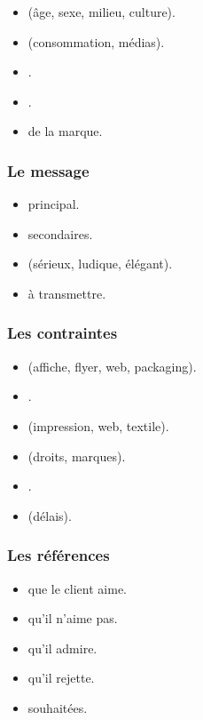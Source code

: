 \begin{itemize}
    \item {} (âge, sexe, milieu, culture).
    \item {} (consommation, médias).
    \item {}.
    \item {}.
    \item {} de la marque.
\end{itemize}

\subsubsection{Le message}

\begin{itemize}
    \item {} principal.
    \item {} secondaires.
    \item {} (sérieux, ludique, élégant).
    \item {} à transmettre.
\end{itemize}

\subsubsection{Les contraintes}

\begin{itemize}
    \item {} (affiche, flyer, web, packaging).
    \item {}.
    \item {} (impression, web, textile).
    \item {} (droits, marques).
    \item {}.
    \item {} (délais).
\end{itemize}

\subsubsection{Les références}

\begin{itemize}
    \item {} que le client aime.
    \item {} qu'il n'aime pas.
    \item {} qu'il admire.
    \item {} qu'il rejette.
    \item {} souhaitées.
\end{itemize}

